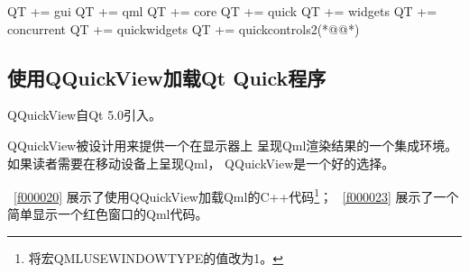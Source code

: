 \FloatBarrier
\begin{thebookfilesourceone}[escapeinside={(*@}{@*)},
label=f00002u,
caption=GoodLuck,
title=\lstlistingname \thelstlisting
]
QT += gui
QT += qml
QT += core
QT += quick
QT += widgets
QT += concurrent
QT += quickwidgets
QT += quickcontrols2(*@\marginpar[\hfill\setlength\fboxsep{2pt}\fbox{\footnotesize{\kaishu\parbox{1em}{\setlength{\baselineskip}{2pt}\lstlistingname}}\footnotesize{\thelstlisting}}]{\setlength\fboxsep{2pt}\fbox{\footnotesize{\kaishu\parbox{1em}{\setlength{\baselineskip}{2pt}\lstlistingname}}\footnotesize{\thelstlisting}}}@*)\end{thebookfilesourceone}          %

\FloatBarrier
\subsection{
使用QQuickView加载Qt Quick程序
}\label{ss001010}


QQuickView自Qt 5.0引入。

QQuickView被设计用来提供一个在显示器上
呈现Qml渲染结果的一个集成环境。
如果读者需要在移动设备上呈现Qml，
QQuickView是一个好的选择。

\lstlistingname\ \ref{f000020}
展示了使用QQuickView加载Qml的C{\sourcefonttwo{}+}{\sourcefonttwo{}+}代码\footnote{
将宏QML\underline{\hspace{0.5em}}USE\underline{\hspace{0.5em}}WINDOW\underline{\hspace{0.5em}}TYPE的值改为1。
}；
\lstlistingname\ \ref{f000023}
展示了一个简单显示一个红色窗口的Qml代码。

